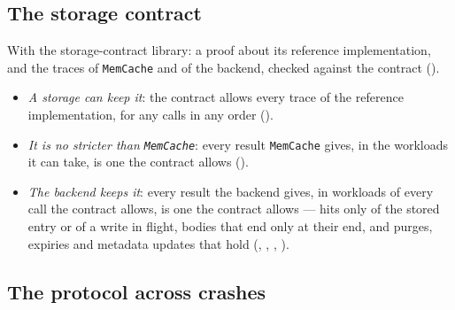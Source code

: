 \subsection{The storage contract}

With the storage-contract library: a proof about its reference
implementation, and the traces of \texttt{MemCache} and of the backend,
checked against the contract ().
\begin{itemize}
  \item \emph{A storage can keep it}: the contract allows every trace of
    the reference implementation, for any calls in any order
    ().
  \item \emph{It is no stricter than \texttt{MemCache}}: every result
    \texttt{MemCache} gives, in the workloads it can take, is one the
    contract allows ().
  \item \emph{The backend keeps it}: every result the backend gives, in
    workloads of every call the contract allows, is one the contract
    allows --- hits only of the stored entry or of a write in flight,
    bodies that end only at their end, and purges, expiries and metadata
    updates that hold (,
    , ,
    ).
\end{itemize}

\subsection{The protocol across crashes}

